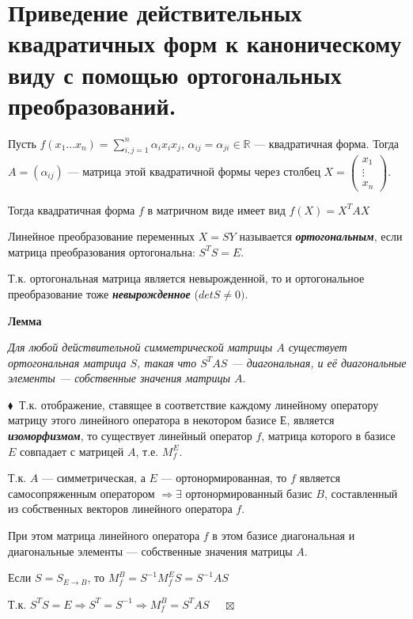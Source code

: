 \documentclass[a4paper, 12pt]{report}
\begin{document}
	
	
	
	
	
	
	
	
	\section{Приведение действительных квадратичных форм к каноническому виду с помощью ортогональных преобразований.}
	
	\quad\;Пусть $f(x_1...x_n)=\sum\limits_{i,j=1}^{n}{\alpha_{i}x_i x_j}$, $\alpha_{ij}=\alpha_{ji}\in \mathbb{R}$ --- квадратичная форма. Тогда $A=(\alpha_{ij})$ --- матрица этой квадратичной формы через столбец $X=\begin{pmatrix}x_1\\ \vdots \\ x_n\end{pmatrix}.$
	
	Тогда квадратичная форма $f$ в матричном виде имеет вид $f(X)=X^TAX$
	
	Линейное преобразование переменных $X=SY$ называется \textit{\textbf{ортогональным}}, если матрица преобразования ортогональна: $S^TS=E$.
	
	Т.к. ортогональная матрица является невырожденной, то и ортогональное преобразование тоже \textbf{\textit{невырожденное}} ($det S \neq 0)$.
	\par\bigskip
	\textbf{Лемма}
	
	\textit{Для любой действительной симметрической матрицы $A$ существует ортогональная матрица $S$, такая что $S^TAS$ --- диагональная, и её диагональные элементы --- собственные значения матрицы $A$}.
	\par\bigskip
	$\blacklozenge\ $
	Т.к. отображение, ставящее в соответствие каждому линейному оператору матрицу этого линейного оператора в некотором базисе $Е$, является \textit{\textbf{изоморфизмом}}, то существует линейный оператор $f$, матрица которого в базисе $E$ совпадает с матрицей $A$, т.е. $M_f^E$.
	\par\bigskip
	Т.к. $A$ --- симметрическая, а $E$ --- ортонормированная, то $f$ является самосопряженным оператором $\Rightarrow \exists $ ортонормированный базис $B$, составленный из собственных векторов линейного оператора $f$.
	\par\bigskip
	При этом матрица линейного оператора $f$ в этом базисе диагональная и диагональные элементы --- собственные значения матрицы $A$.
	\par\bigskip
	Если $S=S_{E\rightarrow B}$, то $M_f^B = S^{-1}M_f^E S = S^{-1}AS$
	\par\bigskip
	Т.к. $S^TS=E \Rightarrow S^T = S^{-1} \Rightarrow M_f^B = S^{T}AS$
	$ \quad \boxtimes$
	\par\bigskip
	
\end{document}
